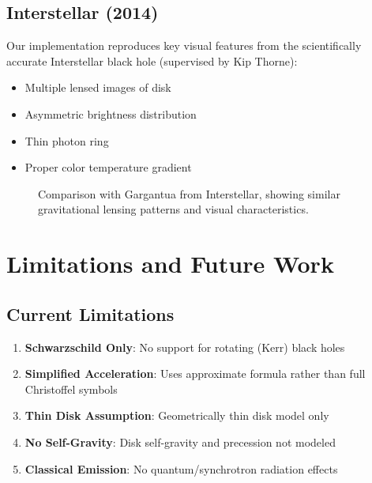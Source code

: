 \documentclass[12pt,a4paper]{article}
\theoremstyle{definition}
\theoremstyle{remark}
\begin{document}
\subsection{Interstellar (2014)}

Our implementation reproduces key visual features from the scientifically accurate Interstellar black hole (supervised by Kip Thorne):

\begin{itemize}
    \item Multiple lensed images of disk
    \item Asymmetric brightness distribution
    \item Thin photon ring
    \item Proper color temperature gradient
\end{itemize}

\begin{figure}[H]
    \centering
    \caption{Comparison with Gargantua from Interstellar, showing similar gravitational lensing patterns and visual characteristics.}
    \label{fig:interstellar_comparison}
\end{figure}

\section{Limitations and Future Work}

\subsection{Current Limitations}

\begin{enumerate}
    \item \textbf{Schwarzschild Only}: No support for rotating (Kerr) black holes
    \item \textbf{Simplified Acceleration}: Uses approximate formula rather than full Christoffel symbols
    \item \textbf{Thin Disk Assumption}: Geometrically thin disk model only
    \item \textbf{No Self-Gravity}: Disk self-gravity and precession not modeled
    \item \textbf{Classical Emission}: No quantum/synchrotron radiation effects
\end{enumerate}
\end{document}

